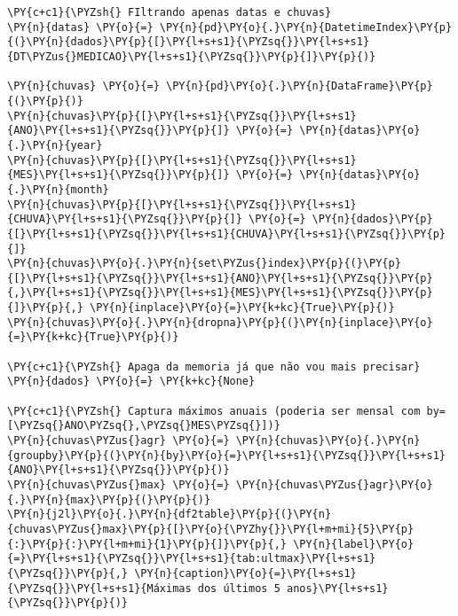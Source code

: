     \begin{tcolorbox}[breakable, size=fbox, boxrule=1pt, pad at break*=1mm,colback=cellbackground, colframe=cellborder]
\begin{Verbatim}[commandchars=\\\{\}]
\PY{c+c1}{\PYZsh{} FIltrando apenas datas e chuvas}
\PY{n}{datas} \PY{o}{=} \PY{n}{pd}\PY{o}{.}\PY{n}{DatetimeIndex}\PY{p}{(}\PY{n}{dados}\PY{p}{[}\PY{l+s+s1}{\PYZsq{}}\PY{l+s+s1}{DT\PYZus{}MEDICAO}\PY{l+s+s1}{\PYZsq{}}\PY{p}{]}\PY{p}{)}

\PY{n}{chuvas} \PY{o}{=} \PY{n}{pd}\PY{o}{.}\PY{n}{DataFrame}\PY{p}{(}\PY{p}{)}
\PY{n}{chuvas}\PY{p}{[}\PY{l+s+s1}{\PYZsq{}}\PY{l+s+s1}{ANO}\PY{l+s+s1}{\PYZsq{}}\PY{p}{]} \PY{o}{=} \PY{n}{datas}\PY{o}{.}\PY{n}{year}
\PY{n}{chuvas}\PY{p}{[}\PY{l+s+s1}{\PYZsq{}}\PY{l+s+s1}{MES}\PY{l+s+s1}{\PYZsq{}}\PY{p}{]} \PY{o}{=} \PY{n}{datas}\PY{o}{.}\PY{n}{month}
\PY{n}{chuvas}\PY{p}{[}\PY{l+s+s1}{\PYZsq{}}\PY{l+s+s1}{CHUVA}\PY{l+s+s1}{\PYZsq{}}\PY{p}{]} \PY{o}{=} \PY{n}{dados}\PY{p}{[}\PY{l+s+s1}{\PYZsq{}}\PY{l+s+s1}{CHUVA}\PY{l+s+s1}{\PYZsq{}}\PY{p}{]}
\PY{n}{chuvas}\PY{o}{.}\PY{n}{set\PYZus{}index}\PY{p}{(}\PY{p}{[}\PY{l+s+s1}{\PYZsq{}}\PY{l+s+s1}{ANO}\PY{l+s+s1}{\PYZsq{}}\PY{p}{,}\PY{l+s+s1}{\PYZsq{}}\PY{l+s+s1}{MES}\PY{l+s+s1}{\PYZsq{}}\PY{p}{]}\PY{p}{,} \PY{n}{inplace}\PY{o}{=}\PY{k+kc}{True}\PY{p}{)}
\PY{n}{chuvas}\PY{o}{.}\PY{n}{dropna}\PY{p}{(}\PY{n}{inplace}\PY{o}{=}\PY{k+kc}{True}\PY{p}{)}

\PY{c+c1}{\PYZsh{} Apaga da memoria já que não vou mais precisar}
\PY{n}{dados} \PY{o}{=} \PY{k+kc}{None}

\PY{c+c1}{\PYZsh{} Captura máximos anuais (poderia ser mensal com by=[\PYZsq{}ANO\PYZsq{},\PYZsq{}MES\PYZsq{}])}
\PY{n}{chuvas\PYZus{}agr} \PY{o}{=} \PY{n}{chuvas}\PY{o}{.}\PY{n}{groupby}\PY{p}{(}\PY{n}{by}\PY{o}{=}\PY{l+s+s1}{\PYZsq{}}\PY{l+s+s1}{ANO}\PY{l+s+s1}{\PYZsq{}}\PY{p}{)}
\PY{n}{chuvas\PYZus{}max} \PY{o}{=} \PY{n}{chuvas\PYZus{}agr}\PY{o}{.}\PY{n}{max}\PY{p}{(}\PY{p}{)}
\PY{n}{j2l}\PY{o}{.}\PY{n}{df2table}\PY{p}{(}\PY{n}{chuvas\PYZus{}max}\PY{p}{[}\PY{o}{\PYZhy{}}\PY{l+m+mi}{5}\PY{p}{:}\PY{p}{:}\PY{l+m+mi}{1}\PY{p}{]}\PY{p}{,} \PY{n}{label}\PY{o}{=}\PY{l+s+s1}{\PYZsq{}}\PY{l+s+s1}{tab:ultmax}\PY{l+s+s1}{\PYZsq{}}\PY{p}{,} \PY{n}{caption}\PY{o}{=}\PY{l+s+s1}{\PYZsq{}}\PY{l+s+s1}{Máximas dos últimos 5 anos}\PY{l+s+s1}{\PYZsq{}}\PY{p}{)}
\end{Verbatim}
\end{tcolorbox}

